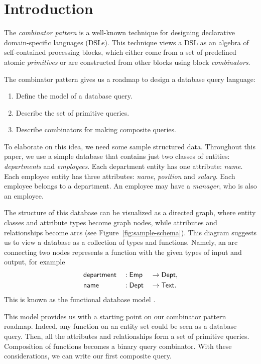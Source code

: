 
\section{Introduction}
\label{sec:introduction}

The \emph{combinator pattern} is a well-known technique for designing
declarative domain-specific languages (DSLs). This technique views a DSL as an
algebra of self-con\-tained processing blocks, which either come from a set of
predefined atomic \emph{primitives} or are constructed from other blocks using
block \emph{combinators}.

The combinator pattern gives us a roadmap to design a database query language:

\begin{enumerate}
\item
Define the model of a database query.

\item
Describe the set of primitive queries.

\item
Describe combinators for making composite queries.
\end{enumerate}

To elaborate on this idea, we need some sample structured data.  Throughout
this paper, we use a simple database that contains just two classes of
entities: \emph{departments} and \emph{employees}.  Each department entity has
one attribute: \emph{name}.  Each employee entity has three attributes:
\emph{name}, \emph{position} and \emph{salary}.  Each employee belongs to a
department.  An employee may have a \emph{manager}, who is also an employee.

The structure of this database can be visualized as a directed graph, where
entity classes and attribute types become graph nodes, while attributes and
relationships become arcs (see Figure~\ref{fig:sample-schema}).  This diagram
suggests us to view a database as a collection of types and functions.  Namely,
an arc connecting two nodes represents a function with the given types of input
and output, for example
\begin{alignat*}{3}
    & \mathsf{department} && : \mathsf{Emp} && \to \mathsf{Dept}, \\
    & \mathsf{name} && : \mathsf{Dept} && \to \mathsf{Text}.
\end{alignat*}
This is known as the functional database model \cite{Kerschberg1976}.



This model provides us with a starting point on our combinator pattern roadmap.
Indeed, any function on an entity set could be seen as a database query.  Then,
all the attributes and relationships form a set of primitive queries.
Composition of functions becomes a binary query combinator.  With these
considerations, we can write our first composite query.

